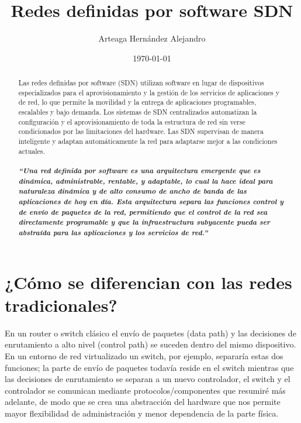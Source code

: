 \documentclass[12pt]{report}
\begin{document}
\title{Redes definidas por software SDN} %
\author{Arteaga Hernández Alejandro}
\date{\today} %
\maketitle



\begin{abstract}
Las redes definidas por software (SDN) utilizan software en lugar de dispositivos especializados para el aprovisionamiento y la gestión de los servicios de aplicaciones y de red, lo que permite la movilidad y la entrega de aplicaciones programables, escalables y bajo demanda. Los sistemas de SDN centralizados automatizan la configuración y el aprovisionamiento de toda la estructura de red sin verse condicionados por las limitaciones del hardware. Las SDN supervisan de manera inteligente y adaptan automáticamente la red para adaptarse mejor a las condiciones actuales.
\\\\
\textbf{\textit{“Una red definida por software es una arquitectura emergente que es dinámica, administrable, rentable,
y adaptable, lo cual la hace ideal para naturaleza dinámica y de alto consumo de ancho de banda de las
aplicaciones de hoy en día. Esta arquitectura separa las funciones control y de envío de paquetes de la
red, permitiendo que el control de la red sea directamente programable y que la infraestructura
subyacente pueda ser abstraída para las aplicaciones y los servicios de red.”}}

\end{abstract}

\section{¿Cómo se diferencian con las redes tradicionales?}
{
En un router o switch clásico el envío de paquetes (data path) y las decisiones de enrutamiento a alto nivel (control path) se suceden dentro del mismo dispositivo. En un entorno de red virtualizado un switch, por ejemplo, separaría estas dos funciones; la parte de envío de paquetes todavía reside en el switch mientras que las decisiones de enrutamiento se separan a un nuevo controlador, el switch y el controlador se comunican mediante protocolos/componentes que resumiré más adelante, de modo que se crea una abstracción del hardware que nos permite mayor flexibilidad de administración y menor dependencia de la parte física.
}
\end{document}
